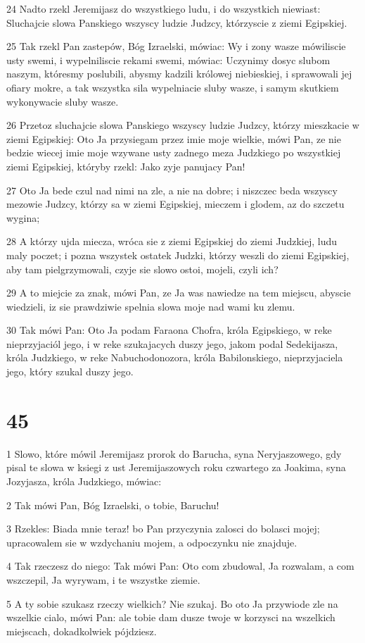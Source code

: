 \par 24 Nadto rzekl Jeremijasz do wszystkiego ludu, i do wszystkich niewiast: Sluchajcie slowa Panskiego wszyscy ludzie Judzcy, którzyscie z ziemi Egipskiej.
\par 25 Tak rzekl Pan zastepów, Bóg Izraelski, mówiac: Wy i zony wasze mówiliscie usty swemi, i wypelniliscie rekami swemi, mówiac: Uczynimy dosyc slubom naszym, któresmy poslubili, abysmy kadzili królowej niebieskiej, i sprawowali jej ofiary mokre, a tak wszystka sila wypelniacie sluby wasze, i samym skutkiem wykonywacie sluby wasze.
\par 26 Przetoz sluchajcie slowa Panskiego wszyscy ludzie Judzcy, którzy mieszkacie w ziemi Egipskiej: Oto Ja przysiegam przez imie moje wielkie, mówi Pan, ze nie bedzie wiecej imie moje wzywane usty zadnego meza Judzkiego po wszystkiej ziemi Egipskiej, któryby rzekl: Jako zyje panujacy Pan!
\par 27 Oto Ja bede czul nad nimi na zle, a nie na dobre; i niszczec beda wszyscy mezowie Judzcy, którzy sa w ziemi Egipskiej, mieczem i glodem, az do szczetu wygina;
\par 28 A którzy ujda miecza, wróca sie z ziemi Egipskiej do ziemi Judzkiej, ludu maly poczet; i pozna wszystek ostatek Judzki, którzy weszli do ziemi Egipskiej, aby tam pielgrzymowali, czyje sie slowo ostoi, mojeli, czyli ich?
\par 29 A to miejcie za znak, mówi Pan, ze Ja was nawiedze na tem miejscu, abyscie wiedzieli, iz sie prawdziwie spelnia slowa moje nad wami ku zlemu.
\par 30 Tak mówi Pan: Oto Ja podam Faraona Chofra, króla Egipskiego, w reke nieprzyjaciól jego, i w reke szukajacych duszy jego, jakom podal Sedekijasza, króla Judzkiego, w reke Nabuchodonozora, króla Babilonskiego, nieprzyjaciela jego, który szukal duszy jego.

\chapter{45}

\par 1 Slowo, które mówil Jeremijasz prorok do Barucha, syna Neryjaszowego, gdy pisal te slowa w ksiegi z ust Jeremijaszowych roku czwartego za Joakima, syna Jozyjasza, króla Judzkiego, mówiac:
\par 2 Tak mówi Pan, Bóg Izraelski, o tobie, Baruchu!
\par 3 Rzekles: Biada mnie teraz! bo Pan przyczynia zalosci do bolasci mojej; upracowalem sie w wzdychaniu mojem, a odpoczynku nie znajduje.
\par 4 Tak rzeczesz do niego: Tak mówi Pan: Oto com zbudowal, Ja rozwalam, a com wszczepil, Ja wyrywam, i te wszystke ziemie.
\par 5 A ty sobie szukasz rzeczy wielkich? Nie szukaj. Bo oto Ja przywiode zle na wszelkie cialo, mówi Pan: ale tobie dam dusze twoje w korzysci na wszelkich miejscach, dokadkolwiek pójdziesz.

